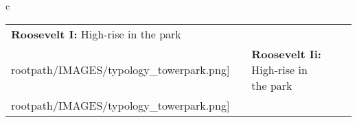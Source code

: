 \begin{table}[H]
        \begin{tabular}{c}
        \begin{tabular}{m{1.25in} m{2in} m{.1in} m{1.25in} m{2in}}
\textbf{Roosevelt I:} {High-rise in the park} & \texttt{[image: \\rootpath/IMAGES/typology\_towerpark.png]} & & \textbf{Roosevelt Ii:} {High-rise in the park} & \texttt{[image: \\rootpath/IMAGES/typology\_towerpark.png]}
\end{tabular}\end{tabular}
        \end{table}